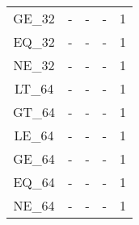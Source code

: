 \begin{longtable}{|c|c|c|c|c|}
GE\_32                  & -       & -       & -       & 1        \\
EQ\_32                  & -       & -       & -       & 1        \\
NE\_32                  & -       & -       & -       & 1        \\
LT\_64                  & -       & -       & -       & 1        \\
GT\_64                  & -       & -       & -       & 1        \\
LE\_64                  & -       & -       & -       & 1        \\
GE\_64                  & -       & -       & -       & 1        \\
EQ\_64                  & -       & -       & -       & 1        \\
NE\_64                  & -       & -       & -       & 1        \\
\end{longtable}

